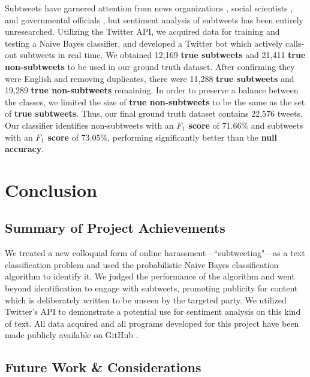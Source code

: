 \documentclass[11pt, twoside, reqno]{book}
\begin{document}
Subtweets have garnered attention from news organizations \cite{the_atlantic}, social scientists \cite{subtweets_communications}, and governmental officials \cite{the_washington_post_trump}, but sentiment analysis of subtweets has been entirely unresearched. Utilizing the Twitter API, we acquired data for training and testing a Naive Bayes classifier, and developed a Twitter bot which actively calls-out subtweets in real time. We obtained 12,169 \textbf{true subtweets} and 21,411 \textbf{true non-subtweets} to be used in our ground truth dataset. After confirming they were English and removing duplicates, there were 11,288 \textbf{true subtweets} and 19,289 \textbf{true non-subtweets} remaining. In order to preserve a balance between the classes, we limited the size of \textbf{true non-subtweets} to be the same as the set of \textbf{true subtweets}. Thus, our final ground truth dataset contains 22,576 tweets. Our classifier identifies non-subtweets with an \textbf{$F_{1}$ score} of 71.66\% and subtweets with an \textbf{$F_{1}$ score} of 73.05\%, performing significantly better than the \textbf{null accuracy}.

\chapter{Conclusion}
\label{conclusion}

\section{Summary of Project Achievements}
\label{summary}

We treated a new colloquial form of online harassment---``subtweeting"---as a text classification problem and used the probabilistic Naive Bayes classification algorithm to identify it. We judged the performance of the algorithm and went beyond identification to engage with subtweets, promoting publicity for content which is deliberately written to be unseen by the targeted party. We utilized Twitter's API to demonstrate a potential use for sentiment analysis on this kind of text.
\linebreak
\linebreak
\noindent
All data acquired and all programs developed for this project have been made publicly available on GitHub \cite{github}.

\section{Future Work \& Considerations}
\label{future_work_and_considerations}
\end{document}
